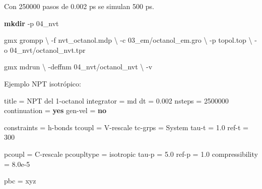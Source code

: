 \documentclass[
  spanish,
  11pt,
  a4paper]{article}
\newenvironment{Shaded}{\begin{snugshade}}{\end{snugshade}}
\newcommand{\AttributeTok}[1]{\textcolor[rgb]{0.13,0.29,0.53}{#1}}
\newcommand{\DataTypeTok}[1]{\textcolor[rgb]{0.13,0.29,0.53}{#1}}
\newcommand{\DecValTok}[1]{\textcolor[rgb]{0.00,0.00,0.81}{#1}}
\newcommand{\ExtensionTok}[1]{#1}
\newcommand{\FloatTok}[1]{\textcolor[rgb]{0.00,0.00,0.81}{#1}}
\newcommand{\FunctionTok}[1]{\textcolor[rgb]{0.13,0.29,0.53}{\textbf{#1}}}
\newcommand{\KeywordTok}[1]{\textcolor[rgb]{0.13,0.29,0.53}{\textbf{#1}}}
\newcommand{\NormalTok}[1]{#1}
\newcommand{\OtherTok}[1]{\textcolor[rgb]{0.56,0.35,0.01}{#1}}
\newcommand{\StringTok}[1]{\textcolor[rgb]{0.31,0.60,0.02}{#1}}
\begin{document}
Con 250000 pasos de 0.002 ps se simulan 500 ps.

\begin{Shaded}
\begin{Highlighting}[]
\FunctionTok{mkdir} \AttributeTok{{-}p}\NormalTok{ 04\_nvt}

\ExtensionTok{gmx}\NormalTok{ grompp }\DataTypeTok{\textbackslash{}}
    \AttributeTok{{-}f}\NormalTok{ nvt\_octanol.mdp }\DataTypeTok{\textbackslash{}}
    \AttributeTok{{-}c}\NormalTok{ 03\_em/octanol\_em.gro }\DataTypeTok{\textbackslash{}}
    \AttributeTok{{-}p}\NormalTok{ topol.top }\DataTypeTok{\textbackslash{}}
    \AttributeTok{{-}o}\NormalTok{ 04\_nvt/octanol\_nvt.tpr}

\ExtensionTok{gmx}\NormalTok{ mdrun }\DataTypeTok{\textbackslash{}}
    \AttributeTok{{-}deffnm}\NormalTok{ 04\_nvt/octanol\_nvt }\DataTypeTok{\textbackslash{}}
    \AttributeTok{{-}v}
\end{Highlighting}
\end{Shaded}

Ejemplo NPT isotrópico:

\begin{Shaded}
\begin{Highlighting}[]
\DataTypeTok{title            }\OtherTok{=}\StringTok{ NPT del 1{-}octanol}
\DataTypeTok{integrator       }\OtherTok{=}\StringTok{ md}
\DataTypeTok{dt               }\OtherTok{=}\StringTok{ }\FloatTok{0.002}
\DataTypeTok{nsteps           }\OtherTok{=}\StringTok{ }\DecValTok{2500000}
\DataTypeTok{continuation     }\OtherTok{=}\StringTok{ }\KeywordTok{yes}
\DataTypeTok{gen{-}vel          }\OtherTok{=}\StringTok{ }\KeywordTok{no}

\DataTypeTok{constraints      }\OtherTok{=}\StringTok{ h{-}bonds}
\DataTypeTok{tcoupl           }\OtherTok{=}\StringTok{ V{-}rescale}
\DataTypeTok{tc{-}grps          }\OtherTok{=}\StringTok{ System}
\DataTypeTok{tau{-}t            }\OtherTok{=}\StringTok{ }\FloatTok{1.0}
\DataTypeTok{ref{-}t            }\OtherTok{=}\StringTok{ }\DecValTok{300}

\DataTypeTok{pcoupl            }\OtherTok{=}\StringTok{ C{-}rescale}
\DataTypeTok{pcoupltype        }\OtherTok{=}\StringTok{ isotropic}
\DataTypeTok{tau{-}p             }\OtherTok{=}\StringTok{ }\FloatTok{5.0}
\DataTypeTok{ref{-}p             }\OtherTok{=}\StringTok{ }\FloatTok{1.0}
\DataTypeTok{compressibility   }\OtherTok{=}\StringTok{ 8.0e{-}5}

\DataTypeTok{pbc              }\OtherTok{=}\StringTok{ xyz}
\end{Highlighting}
\end{Shaded}
\end{document}
